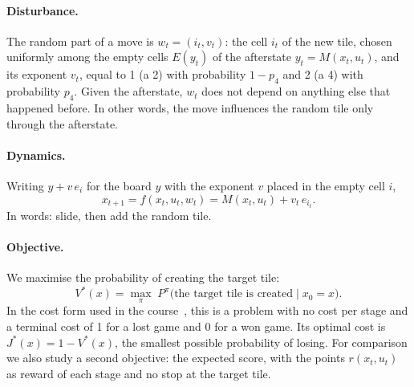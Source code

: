 \documentclass[11pt,a4paper]{article}
\theoremstyle{remark}
\begin{document}
\paragraph{Disturbance.} The random part of a move is $w_t=(i_t,v_t)$: the cell $i_t$ of the new tile, chosen uniformly among the empty cells $E(y_t)$ of the afterstate $y_t=M(x_t,u_t)$, and its exponent $v_t$, equal to 1 (a 2) with probability $1-p_4$ and 2 (a 4) with probability $p_4$. Given the afterstate, $w_t$ does not depend on anything else that happened before. In other words, the move influences the random tile only through the afterstate.

\paragraph{Dynamics.} Writing $y+v\,e_i$ for the board $y$ with the exponent $v$ placed in the empty cell $i$,
\[
x_{t+1}=f(x_t,u_t,w_t)=M(x_t,u_t)+v_t\,e_{i_t}.
\]
In words: slide, then add the random tile.

\paragraph{Objective.} We maximise the probability of creating the target tile:
\[
V^*(x)=\max_{\pi}\; P^{\pi}\bigl(\text{the target tile is created}\mid x_0=x\bigr).
\]
In the cost form used in the course~\cite{bertsekas2019}, this is a problem with no cost per stage and a terminal cost of 1 for a lost game and 0 for a won game. Its optimal cost is $J^*(x)=1-V^*(x)$, the smallest possible probability of losing. For comparison we also study a second objective: the expected score, with the points $r(x_t,u_t)$ as reward of each stage and no stop at the target tile.
\end{document}
